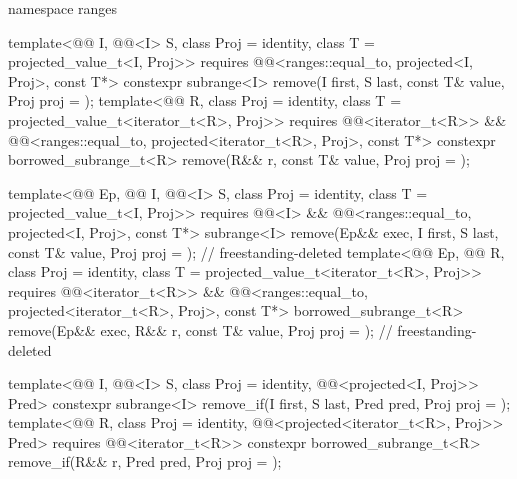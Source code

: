 \begin{codeblock}
{  namespace ranges {
    template<@@ I, @@<I> S, class Proj = identity,
             class T = projected_value_t<I, Proj>>
      requires @@<ranges::equal_to, projected<I, Proj>, const T*>
      constexpr subrange<I> remove(I first, S last, const T& value, Proj proj = {});
    template<@@ R, class Proj = identity,
             class T = projected_value_t<iterator_t<R>, Proj>>
      requires @@<iterator_t<R>> &&
               @@<ranges::equal_to,
                                         projected<iterator_t<R>, Proj>, const T*>
      constexpr borrowed_subrange_t<R>
        remove(R&& r, const T& value, Proj proj = {});

    template<@@ Ep, @@ I, @@<I> S,
             class Proj = identity, class T = projected_value_t<I, Proj>>
      requires @@<I> &&
               @@<ranges::equal_to, projected<I, Proj>, const T*>
      subrange<I> remove(Ep&& exec, I first, S last, const T& value,
                         Proj proj = {});                                   // freestanding-deleted
    template<@@ Ep, @@ R, class Proj = identity,
             class T = projected_value_t<iterator_t<R>, Proj>>
      requires @@<iterator_t<R>> &&
               @@<ranges::equal_to,
                                         projected<iterator_t<R>, Proj>, const T*>
      borrowed_subrange_t<R>
        remove(Ep&& exec, R&& r, const T& value, Proj proj = {});           // freestanding-deleted

    template<@@ I, @@<I> S, class Proj = identity,
             @@<projected<I, Proj>> Pred>
      constexpr subrange<I> remove_if(I first, S last, Pred pred, Proj proj = {});
    template<@@ R, class Proj = identity,
             @@<projected<iterator_t<R>, Proj>> Pred>
      requires @@<iterator_t<R>>
      constexpr borrowed_subrange_t<R>
        remove_if(R&& r, Pred pred, Proj proj = {});

}}
\end{codeblock}
